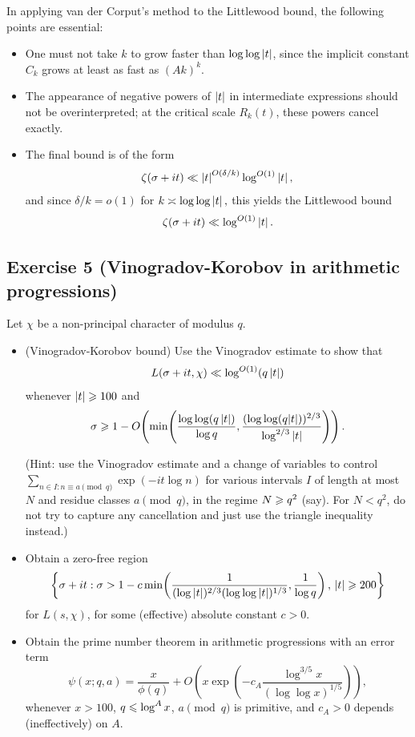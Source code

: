 \begin{remark}
In applying van der Corput's method to the Littlewood bound, the following points are essential:
\begin{itemize}
    \item One must not take $k$ to grow faster than $\log \log \left\lvert t \right\rvert$, since the implicit constant $C_k$ grows at least as fast as $(Ak)^k$.
    \item The appearance of negative powers of $\left\lvert t \right\rvert$ in intermediate expressions should not be overinterpreted; at the critical scale $R_k(t)$, these powers cancel exactly.
    \item The final bound is of the form $$\zeta(\sigma+it) \ll \left\lvert t \right\rvert^{O(\delta/k)}\log^{O(1)}\left\lvert t \right\rvert,$$ and since $\delta/k=o(1)$ for $k\asymp \log\log \left\lvert t \right\rvert,$ this yields the Littlewood bound $$\zeta(\sigma+it)\ll \log^{O(1)}\left\lvert t \right\rvert.$$
\end{itemize}
\end{remark}

\subsection{Exercise 5 (Vinogradov-Korobov in arithmetic progressions)}

\begin{theorem}
    Let $\chi$ be a non-principal character of modulus $q$.
    \begin{itemize}
        \item[(i)] (Vinogradov-Korobov bound) Use the Vinogradov estimate to show that 
          \[ L(\sigma + it, \chi) \ll \log^{O(1)} (q\left\lvert t \right\rvert) \]
          whenever $\left\lvert t \right\rvert \geqslant 100$ and
          \[ \sigma \geqslant 1 - O\!\left( \min\!\left( \frac{\log\log(q\left\lvert t \right\rvert)}{\log q}, \frac{(\log\log(q|t|))^{2/3}}{\log^{2/3} |t|} \right) \right). \]
    
          (Hint: use the Vinogradov estimate and a change of variables to control $\sum_{n \in I: n \equiv a \pmod{q}} \exp(-it \log n)$ for various intervals $I$ of length at most $N$ and residue classes $a \pmod{q}$, in the regime $N \geqslant q^2$ (say). For $N < q^2$, do not try to capture any cancellation and just use the triangle inequality instead.)
        
        \item[(ii)] Obtain a zero-free region
          $$\left\{ \sigma + it : \sigma > 1 - c \min\!\left( \frac{1}{(\log |t|)^{2/3} (\log\log |t|)^{1/3}}, \frac{1}{\log q} \right), \, |t| \geqslant 200 \right\}$$
          for $L(s, \chi)$, for some (effective) absolute constant $c > 0$.
        
        \item[(iii)] Obtain the prime number theorem in arithmetic progressions with an error term
          $$\psi(x; q, a) = \frac{x}{\phi(q)} + O\!\left( x \exp\!\left( -c_A \frac{\log^{3/5} x}{(\log\log x)^{1/5}} \right) \right),$$ whenever $x > 100$, $q \leqslant \log^A x$, $a \pmod{q}$ is primitive, and $c_A > 0$ depends (ineffectively) on $A$.
    \end{itemize}
\end{theorem}

